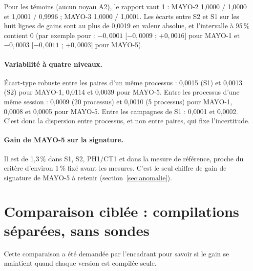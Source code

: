 \F{} Pour les témoins (aucun noyau A2), le rapport vaut 1 : MAYO-2  1,0000 / 1,0000 et  1,0001 / 0,9996 ; MAYO-3  1,0000 / 1,0001. Les écarts entre S2 et S1 sur les huit lignes de gains sont au plus de 0,0019 en valeur absolue, et l'intervalle à 95\,\% contient 0 (par exemple pour  : $-0{,}0001$ [$-0{,}0009$ ; $+0{,}0016$] pour MAYO-1 et $-0{,}0003$ [$-0{,}0011$ ; $+0{,}0003$] pour MAYO-5).

\paragraph{Variabilité à quatre niveaux.} Écart-type robuste entre les paires d'un même processus : 0,0015 (S1) et 0,0013 (S2) pour MAYO-1, 0,0114 et 0,0039 pour MAYO-5. Entre les processus d'une même session : 0,0009 (20 processus) et 0,0010 (5 processus) pour MAYO-1, 0,0008 et 0,0005 pour MAYO-5. Entre les campagnes de S1 : 0,0001 et 0,0002. C'est donc la dispersion entre processus, et non entre paires, qui fixe l'incertitude.

\paragraph{Gain de MAYO-5 sur la signature.} \F{} Il est de 1,3\,\% dans S1, S2, PH1/CT1 et dans la mesure de référence, proche du critère d'environ 1\,\% fixé avant les mesures. C'est le seul chiffre de gain de signature de MAYO-5 à retenir (section~\ref{sec:anomalie}).

\section[Comparaison ciblée]{Comparaison ciblée : compilations séparées, sans sondes}\label{sec:iso}
Cette comparaison a été demandée par l'encadrant pour savoir si le gain se maintient quand chaque version est compilée seule.
